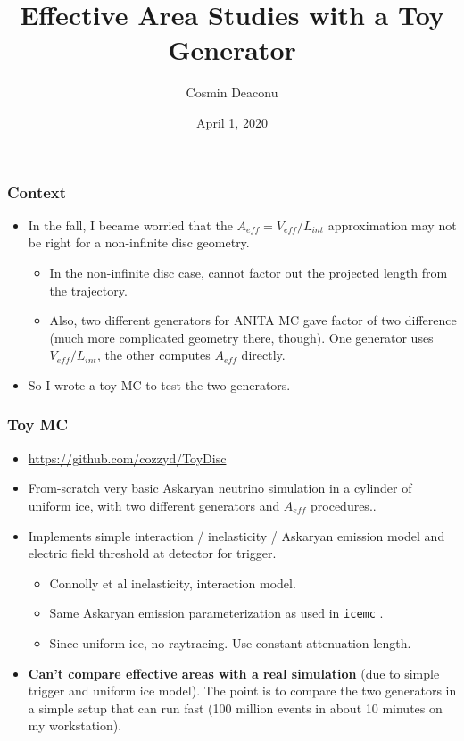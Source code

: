 \documentclass[hyperref={pdfpagelabels=false},aspectratio=169]{beamer} \mode<presentation> { \usetheme{Boadilla} }
\title[Toy Studies]{Effective Area Studies with a Toy Generator}
\author{Cosmin Deaconu}
\date{April 1, 2020}
\institute{UChicago/KICP}
\begin{document}
 

\begin{frame}[plain]
  \maketitle
\end{frame} 

\begin{frame}
\frametitle{Context} 
\begin{itemize} 
\item In the fall, I became worried that the $A_{eff} = V_{eff}/L_{int}$ approximation may not be right for a non-infinite disc geometry. 
\begin{itemize}
\item In the non-infinite disc case, cannot factor out the projected length from the trajectory. 
\item Also, two different generators for ANITA MC gave factor of two difference (much more complicated geometry there, though). One generator uses $V_{eff}/L_{int}$, the other computes $A_{eff}$ directly. 
\end{itemize}
\item So I wrote a toy MC to test the two generators. 
\end{itemize} 
\end{frame} 

\begin{frame} 
\frametitle{Toy MC} 
\begin{itemize}
\item \url{https://github.com/cozzyd/ToyDisc} 
\item From-scratch very basic Askaryan neutrino simulation in a cylinder of uniform ice, with two different generators and $A_{eff}$ procedures..  
\item Implements simple interaction / inelasticity / Askaryan emission model and electric field threshold at detector for trigger. 
\begin{itemize}
\item Connolly et al inelasticity, interaction model. 
\item Same Askaryan emission parameterization as used in \texttt{icemc} . 
\item Since uniform ice, no raytracing.  Use constant attenuation length. 
\end{itemize} 
\item \textbf{Can't compare effective areas with a real simulation} (due to simple trigger and uniform ice model). The point is to compare the two generators in a simple setup that can run fast (100 million events in about 10 minutes on my workstation). 
\end{itemize}
\end{frame}
\end{document}

